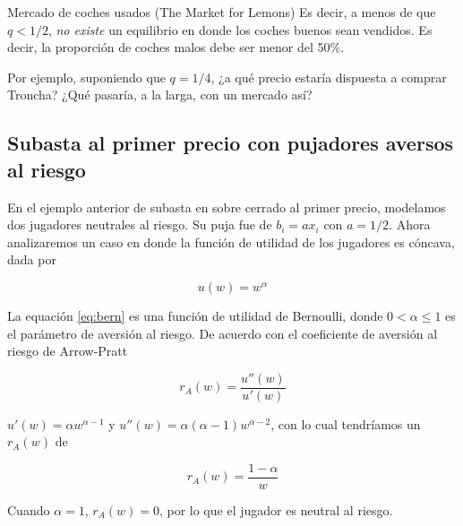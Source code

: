\documentclass[12pt]{article}
\begin{document}
\begin{exbox}{Mercado de coches usados (The Market for Lemons)}
	Es decir, a menos de que $q<1/2$, \textit{no existe} un equilibrio  en donde los coches buenos sean vendidos. Es decir, la proporción de coches malos debe ser menor del 50\%.

	Por ejemplo, suponiendo que $q=1/4$, ¿a qué precio estaría dispuesta a comprar Troncha? ¿Qué pasaría, a la larga, con un mercado así?

\end{exbox}

\subsection{Subasta al primer precio con pujadores aversos al riesgo}

En el ejemplo anterior de subasta en sobre cerrado al primer precio, modelamos dos jugadores neutrales al riesgo. Su puja fue de $b_i = ax_i$ con $a=1/2$. Ahora analizaremos un caso en donde la función de utilidad de los jugadores es cóncava, dada por

\begin{equation}
	u(w) = w^\alpha
	\label{eq:bern}
\end{equation}

La equación \ref{eq:bern} es una función de utilidad de Bernoulli, donde $0 < \alpha \leq 1$ es el parámetro de aversión al riesgo. De acuerdo con el coeficiente de aversión al riesgo de  Arrow-Pratt

\[
	r_A(w) = \frac{u''(w)}{u'(w)}
\]

$u'(w)=\alpha w^{\alpha - 1}$ y $u''(w)=\alpha (\alpha - 1) w^{\alpha - 2}$, con lo cual tendríamos un $r_A(w)$ de

\[
	r_A(w) = \frac{1-\alpha}{w}
\]

Cuando $\alpha = 1$, $r_A(w) = 0$, por lo que el jugador es neutral al riesgo.
\end{document}

